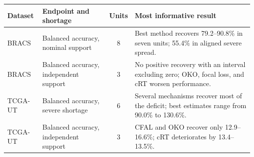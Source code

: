 \begin{tabularx}{\textwidth}{@{}l l c X@{}}
\toprule
Dataset & Endpoint and shortage & Units & Most informative result \\
\midrule
BRACS & Balanced accuracy, nominal support & 8 & Best method recovers \num{79.2}--\num{90.8}\% in seven units; \num{55.4}\% in aligned severe spread. \\
BRACS & Balanced accuracy, independent support & 3 & No positive recovery with an interval excluding zero; OKO, focal loss, and cRT worsen performance. \\
TCGA-UT & Balanced accuracy, severe shortage & 6 & Several mechanisms recover most of the deficit; best estimates range from \num{90.0}\% to \num{130.6}\%. \\
TCGA-UT & Balanced accuracy, independent support & 3 & CFAL and OKO recover only \num{12.9}--\num{16.6}\%; cRT deteriorates by \num{13.4}--\num{13.5}\%. \\
\bottomrule
\end{tabularx}
